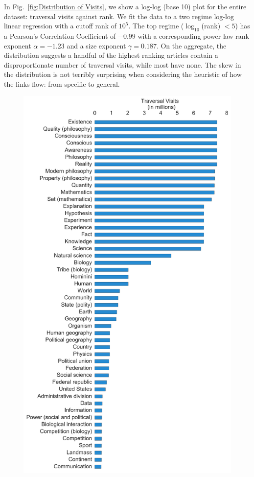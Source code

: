 \documentclass[11pt]{report}
\begin{document}
In Fig.~\ref{fig:Distribution of Visits}, we show a log-log (base 10) plot for the entire dataset: traversal visits against rank. 
We fit the data to a two regime log-log linear regression with a cutoff rank 
of $10^{5}$.
The top regime ($\log_{10}$(rank) $< 5$) has a Pearson's Correlation 
Coefficient of $-0.99$ with a corresponding power law rank exponent 
$\alpha = -1.23$ and a size exponent $\gamma = 0.187$.
On the aggregate, the distribution suggests
a handful of the highest ranking articles contain a disproportionate number of traversal visits, while most have none. The skew in the distribution is not terribly surprising when considering the heuristic of how the links flow: from specific to general. 


\begin{figure}[tp!]
  \includegraphics[width=\columnwidth]{graphics/articles_ranked.png}

\end{figure}
\end{document}
